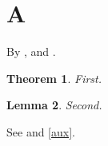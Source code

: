 \documentclass{article}
\newtheorem{thm}{Theorem}[section]
\newtheorem{lem}[thm]{Lemma}
\begin{document}
\section{A}
By , and .
\begin{thm}
First.
\end{thm}
\begin{lem}
Second.
\end{lem}
See  and \ref{aux}.
\end{document}
